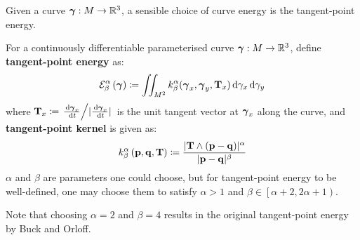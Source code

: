 \documentclass[../dissertation.tex]{subfiles}
\begin{document}
Given a curve $\boldsymbol{\gamma}:M \rightarrow \mathbb{R}^3$,
a sensible choice of curve energy is the tangent-point energy\cite{YSC2021}.
\begin{definition}
    For a continuously differentiable parameterised curve $\boldsymbol{\gamma}:M \rightarrow \mathbb{R}^3$, define \textbf{tangent-point energy} as:
    \begin{equation}
        \mathcal{E}_{\beta}^{\alpha} \left( \boldsymbol{\gamma} \right) \coloneqq \iint_{M^2} k_{\beta}^{\alpha} (\boldsymbol{\gamma}_x, \boldsymbol{\gamma}_y, \mathbf{T}_x) \, \text{d} \gamma_x \, \text{d} \gamma_y 
        \label{equ: Tangent-Point Energy}
    \end{equation}
    where $\mathbf{T}_x \coloneqq \left. \frac{\, \text{d} \boldsymbol{\gamma}_x}{\, \text{d} t} \middle/ \lvert\frac{\, \text{d} \boldsymbol{\gamma}_x}{\, \text{d} t}\lvert \right. $ is the unit tangent vector at $\boldsymbol{\gamma}_x$ along the curve,
    and \textbf{tangent-point kernel} is given as:
    \begin{equation}
        k_{\beta}^{\alpha} \left( \pbf, \qbf, \Tbf \right) \coloneqq \frac{\abs{\Tbf \wedge \left( \pbf - \qbf \right)}^{\alpha}}{\abs{\pbf - \qbf}^{\beta}}
    \end{equation}
    $\alpha$ and $\beta$ are parameters one could choose, but for tangent-point energy to be well-defined,
    one may choose them to satisfy $\alpha >1$ and $\beta \in \left[ \alpha+2, 2\alpha + 1 \right)$.

    Note that choosing $\alpha = 2$ and $\beta = 4$ results in the original tangent-point energy by Buck and Orloff\cite{BO1995}.
\end{definition}
\end{document}
